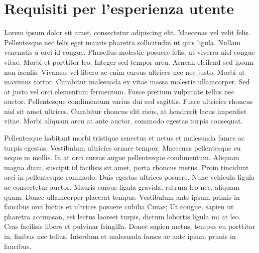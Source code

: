 \documentclass[11pt,fleqn]{book} %
\begin{document}
    
    
    
    

\section{Requisiti per l'esperienza utente}
Lorem ipsum dolor sit amet, consectetur adipiscing elit. Maecenas vel velit felis. Pellentesque nec felis eget mauris pharetra sollicitudin ut quis ligula. Nullam venenatis a orci id congue. Phasellus molestie posuere felis, ut viverra nisl congue vitae. Morbi et porttitor leo. Integer sed tempor arcu. Aenean eleifend sed ipsum non iaculis. Vivamus vel libero ac enim cursus ultrices nec nec justo. Morbi ut maximus tortor. Curabitur malesuada ex vitae massa molestie ullamcorper. Sed at justo vel orci elementum fermentum. Fusce pretium vulputate tellus nec auctor. Pellentesque condimentum varius dui sed sagittis. Fusce ultricies rhoncus nisl sit amet ultrices. Curabitur rhoncus elit risus, at hendrerit lacus imperdiet vitae. Morbi aliquam arcu at ante auctor, commodo egestas turpis consequat.

Pellentesque habitant morbi tristique senectus et netus et malesuada fames ac turpis egestas. Vestibulum ultricies ornare tempor. Maecenas pellentesque eu neque in mollis. In at orci cursus augue pellentesque condimentum. Aliquam magna diam, suscipit id facilisis sit amet, porta rhoncus metus. Proin tincidunt orci in pellentesque commodo. Duis egestas ultrices posuere. Nunc vehicula ligula ac consectetur auctor. Mauris cursus ligula gravida, rutrum leo nec, aliquam quam. Donec ullamcorper placerat tempus. Vestibulum ante ipsum primis in faucibus orci luctus et ultrices posuere cubilia Curae; Ut congue, sapien ut pharetra accumsan, est lectus laoreet turpis, dictum lobortis ligula mi at leo. Cras facilisis libero et pulvinar fringilla. Donec sapien metus, tempus eu porttitor in, finibus nec tellus. Interdum et malesuada fames ac ante ipsum primis in faucibus.
\end{document}
